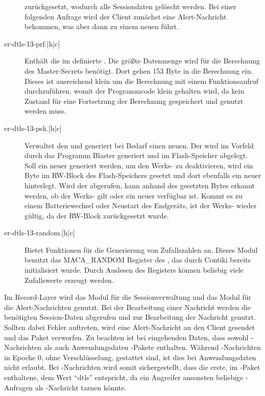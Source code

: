 \begin{description}
					zurückgesetzt, wodurch alle Sessiondaten gelöscht werden. Bei einer folgenden Anfrage wird der Client zunächst eine
					Alert-Nachricht bekommen, was aber dann zu einem neuen  führt.
  \item[er-dtls-13-prf.{$[$h|c$]$}] Enthält die im  definierte . Die größte Datenmenge wird für die Berechnung des Master-Secrets
					benötigt. Dort gehen 153 Byte in die Berechnung ein. Dieses ist ausreichend klein um die Berechnung mit einem
					Funktionsaufruf durchzuführen, womit der Programmcode klein gehalten wird, da kein Zustand für eine Fortsetzung
					der Berechnung gespeichert und genutzt werden muss.
  \item[er-dtls-13-psk.{$[$h|c$]$}] Verwaltet den  und generiert bei Bedarf einen neuen. Der  wird im Vorfeld durch das Programm Blaster
					generiert und im Flash-Speicher abgelegt. Soll ein neuer  generiert werden, um den Werks- zu deaktivieren,
					wird ein Byte im RW-Block des Flash-Speichers gesetzt und dort ebenfalls ein neuer  hinterlegt. Wird der 
					abgerufen, kann anhand des gesetzten Bytes erkannt werden, ob der Werks- gilt oder ein neuer verfügbar ist.
					Kommt es zu einem Batteriewechsel oder Neustart des Endgeräts, ist der Werks- wieder gültig, da der RW-Block
					zurückgesetzt wurde.
  \item[er-dtls-13-random.{$[$h|c$]$}] Bietet Funktionen für die Generierung von Zufallszahlen an. Dieses Modul benutzt das MACA\_RANDOM Register des ,
					das durch Contiki bereits initialisiert wurde. Durch Auslesen des Registers können beliebig viele Zufallswerte erzeugt werden.
\end{description}

Im Record-Layer wird das Modul für die Sessionverwaltung und das Modul für die Alert-Nachrichten genutzt. Bei der Bearbeitung einer Nachricht werden die benötigten
Session-Daten abgerufen und zur Bearbeitung der Nachricht genutzt. Sollten dabei Fehler auftreten, wird eine Alert-Nachricht an den Client gesendet und das Paket verworfen.
Zu beachten ist bei eingehenden Daten, dass sowohl -Nachrichten als auch Anwendungsdaten -Pakete enthalten. Während -Nachrichten in
Epoche 0, ohne Verschlüsselung, gestattet sind, ist dies bei Anwendungsdaten nicht erlaubt. Bei -Nachrichten wird somit sichergestellt, dass die erste,
im -Paket enthaltene,  dem Wert "`dtls"' entspricht, da ein Angreifer ansonsten beliebige -Anfragen als -Nachricht tarnen könnte.

